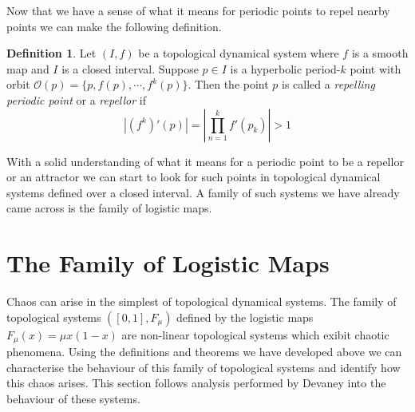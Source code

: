 \documentclass[11pt,a4paper,oneside]{memoir}
\theoremstyle{plain}
\theoremstyle{definition}
\newtheorem{defn}[thm]{Definition}
\begin{document}
Now that we have a sense of what it means for periodic points to repel nearby points we can make the following definition.

\begin{defn} \label{def:repellor}
    Let $(I, f)$ be a topological dynamical system where $f$ is a smooth map and $I$ is a closed interval. Suppose $p \in I$ is a hyperbolic period-$k$ point with orbit $\mathcal{O}(p) = \lbrace p, f(p), \cdots, f^k(p) \rbrace$. Then the point $p$ is called a \emph{repelling periodic point} or a \emph{repellor} if \[|(f^k)'(p)| = \left\lvert \prod_{n = 1}^k f'(p_k) \right\rvert > 1\]
\end{defn}

With a solid understanding of what it means for a periodic point to be a repellor or an attractor we can start to look for such points in topological dynamical systems defined over a closed interval. A family of such systems we have already came across is the family of logistic maps.

\section{The Family of Logistic Maps} \label{sec:logistic_maps}
Chaos can arise in the simplest of topological dynamical systems. The family of topological systems $([0, 1], F_{\mu})$ defined by the logistic maps $F_\mu(x) = \mu x(1-x)$ are non-linear topological systems which exibit chaotic phenomena. Using the definitions and theorems we have developed above we can characterise the behaviour of this family of topological systems and identify how this chaos arises. This section follows analysis performed by Devaney \cite[Section 1.5]{devaney} into the behaviour of these systems.
\end{document}
